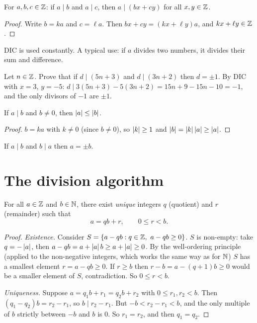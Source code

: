 \begin{proposition}
For $a,b,c \in \mathbb{Z}$: if $a \mid b$ and $a \mid c$, then $a \mid (bx + cy)$ for all $x,y\in\mathbb{Z}$.
\end{proposition}
\begin{proof}
Write $b = ka$ and $c = \ell a$. Then $bx + cy = (kx + \ell y)a$, and $kx + \ell y \in \mathbb{Z}$.
\end{proof}

DIC is used constantly. A typical use: if $a$ divides two numbers, it divides their sum and
difference.

\begin{example}
Let $n \in \mathbb{Z}$. Prove that if $d \mid (5n + 3)$ and $d \mid (3n+2)$ then $d = \pm1$.
By DIC with $x = 3$, $y = -5$: $d \mid 3(5n+3) - 5(3n+2) = 15n + 9 - 15n - 10 = -1$, and the only divisors of $-1$ are $\pm 1$.
\end{example}

\begin{proposition}
If $a \mid b$ and $b \ne 0$, then $\left\lvert a \right\rvert \le \left\lvert b \right\rvert$.
\end{proposition}
\begin{proof}
$b = ka$ with $k \ne 0$ (since $b \ne 0$), so $\left\lvert k \right\rvert \ge 1$ and $\left\lvert b \right\rvert = \left\lvert k \right\rvert\left\lvert a \right\rvert \ge \left\lvert a \right\rvert$.
\end{proof}

\begin{corollary}
If $a \mid b$ and $b \mid a$ then $a = \pm b$.
\end{corollary}

\section{The division algorithm}

\begin{theorem}
For all $a \in \mathbb{Z}$ and $b \in \mathbb{N}$, there exist \emph{unique} integers $q$ (quotient) and $r$
(remainder) such that
\[ a = qb + r, \qquad 0 \le r < b. \]
\end{theorem}

\begin{proof}
\emph{Existence.} Consider $S = \{a - qb : q \in \mathbb{Z},\ a - qb \ge 0\}$. $S$ is non-empty: take
$q = -\left\lvert a \right\rvert$, then $a - qb = a + \left\lvert a \right\rvert b \ge a + \left\lvert a \right\rvert \ge 0$. By the well-ordering principle
(applied to the non-negative integers, which works the same way as for $\mathbb{N}$) $S$ has a smallest
element $r = a - qb \ge 0$. If $r \ge b$ then $r - b = a - (q+1)b \ge 0$ would be a smaller
element of $S$, contradiction. So $0 \le r < b$.

\emph{Uniqueness.} Suppose $a = q_1b + r_1 = q_2b + r_2$ with $0 \le r_1, r_2 < b$. Then
$(q_1 - q_2)b = r_2 - r_1$, so $b \mid r_2 - r_1$. But $-b < r_2 - r_1 < b$, and the only
multiple of $b$ strictly between $-b$ and $b$ is $0$. So $r_1 = r_2$, and then $q_1 = q_2$.
\end{proof}

